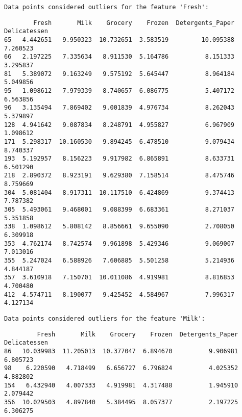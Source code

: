 \documentclass[11pt]{article}
\begin{document}
    \begin{Verbatim}[commandchars=\\\{\}]
Data points considered outliers for the feature 'Fresh':

    \end{Verbatim}

    
    \begin{verbatim}
        Fresh       Milk    Grocery    Frozen  Detergents_Paper  Delicatessen
65   4.442651   9.950323  10.732651  3.583519         10.095388      7.260523
66   2.197225   7.335634   8.911530  5.164786          8.151333      3.295837
81   5.389072   9.163249   9.575192  5.645447          8.964184      5.049856
95   1.098612   7.979339   8.740657  6.086775          5.407172      6.563856
96   3.135494   7.869402   9.001839  4.976734          8.262043      5.379897
128  4.941642   9.087834   8.248791  4.955827          6.967909      1.098612
171  5.298317  10.160530   9.894245  6.478510          9.079434      8.740337
193  5.192957   8.156223   9.917982  6.865891          8.633731      6.501290
218  2.890372   8.923191   9.629380  7.158514          8.475746      8.759669
304  5.081404   8.917311  10.117510  6.424869          9.374413      7.787382
305  5.493061   9.468001   9.088399  6.683361          8.271037      5.351858
338  1.098612   5.808142   8.856661  9.655090          2.708050      6.309918
353  4.762174   8.742574   9.961898  5.429346          9.069007      7.013016
355  5.247024   6.588926   7.606885  5.501258          5.214936      4.844187
357  3.610918   7.150701  10.011086  4.919981          8.816853      4.700480
412  4.574711   8.190077   9.425452  4.584967          7.996317      4.127134
    \end{verbatim}

    
    \begin{Verbatim}[commandchars=\\\{\}]
Data points considered outliers for the feature 'Milk':

    \end{Verbatim}

    
    \begin{verbatim}
         Fresh       Milk    Grocery    Frozen  Detergents_Paper  Delicatessen
86   10.039983  11.205013  10.377047  6.894670          9.906981      6.805723
98    6.220590   4.718499   6.656727  6.796824          4.025352      4.882802
154   6.432940   4.007333   4.919981  4.317488          1.945910      2.079442
356  10.029503   4.897840   5.384495  8.057377          2.197225      6.306275
    \end{verbatim}
\end{document}

